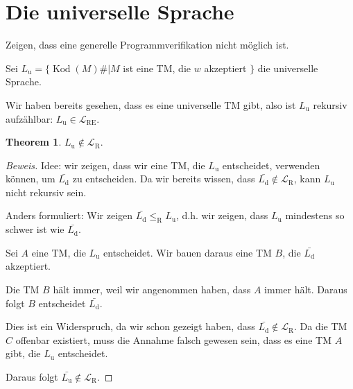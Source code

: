\documentclass[11pt]{article} %
\theoremstyle{definition}
\newtheorem{theorem}{Theorem}
\begin{document}
\section{Die universelle Sprache}

Zeigen, dass eine generelle Programmverifikation nicht möglich ist.

Sei $L_\textrm{u} = \{\operatorname{Kod}(M)\# | M $ ist eine TM, die $w$ akzeptiert $\}$ die universelle Sprache.

Wir haben bereits gesehen, dass es eine universelle TM gibt, also ist $L_\textrm{u}$ rekursiv aufzählbar: $L_\textrm{u} \in \mathcal{L}_\textrm{RE}$.

\begin{theorem}
$L_\textrm{u} \notin \mathcal{L}_\textrm{R}$.
\end{theorem}

\begin{proof}[Beweis]
Idee: wir zeigen, dass wir eine TM, die $L_\textrm{u}$ entscheidet, verwenden können, um $\bar{L_\textrm{d}}$ zu entscheiden.
Da wir bereits wissen, dass $\bar{L_\textrm{d}} \notin \mathcal{L}_\textrm{R}$, kann $L_\textrm{u}$ nicht rekursiv sein.

Anders formuliert: Wir zeigen $\bar{L_\textrm{d}} \le_\textrm{R} L_\textrm{u}$, d.h. wir zeigen, dass $L_\textrm{u}$ mindestens so schwer ist wie $\bar{L_\textrm{d}}$.

Sei $A$ eine TM, die $L_\textrm{u}$ entscheidet. Wir bauen daraus eine TM $B$, die $\bar{L_\textrm{d}}$ akzeptiert.

Die TM $B$ hält immer, weil wir angenommen haben, dass $A$ immer hält. Daraus folgt $B$ entscheidet $\bar{L_\textrm{d}}$.

Dies ist ein Widerspruch, da wir schon gezeigt haben, dass $\bar{L_\textrm{d}} \notin \mathcal{L}_\textrm{R}$. Da die TM $C$ offenbar existiert, muss die Annahme falsch gewesen sein, dass es eine TM $A$ gibt, die $L_\textrm{u}$ entscheidet.

Daraus folgt $\bar{L_\textrm{u}} \notin \mathcal{L}_\textrm{R}$.

\end{proof}
\end{document}
